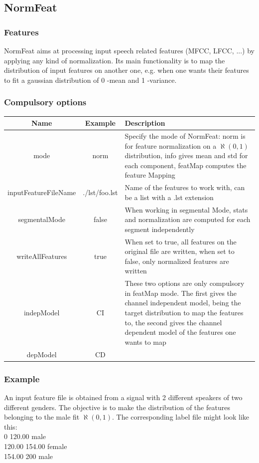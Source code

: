 \documentclass[a4paper]{article}
\begin{document}
\subsection{NormFeat}
\subsubsection{Features}
NormFeat aims at processing input speech related features (MFCC,
LFCC, ...) by applying any kind of normalization. Its main
functionality is to map the distribution of input features on
another one, e.g. when one wants their features to fit a gaussian
distribution of 0 -mean and 1 -variance.

\subsubsection{Compulsory options}

\begin{tabular}{|c|c||p{8cm}|}
\hline Name & Example & Description\\
\hline
\hline mode & norm & Specify the mode of NormFeat: norm is for feature normalization on a $\aleph(0,1)$ distribution, info gives mean and std for each component, featMap computes the feature Mapping\\
\hline inputFeatureFileName & ./lst/foo.lst & Name of the features to work with, can be a list with a .lst extension\\
\hline segmentalMode & false & When working in segmental Mode, stats and normalization are computed for each segment independently\\
\hline writeAllFeatures & true & When set to true, all features on the original file are written, when set to false, only normalized features are written\\
\hline indepModel & CI & These two options are only compulsory in featMap mode. The first gives the channel independent model, being the target distribution to map the features to, the second gives the channel dependent model of the features one wants to map\\
\cline{1-2} depModel & CD & \\
\hline
\end{tabular}

\subsubsection{Example}
An input feature file is obtained from a signal with 2 different
speakers of two different genders. The objective is to make the
distribution of the features belonging to the male fit
$\aleph(0,1)$.
The corresponding label file might look like this:\\
0 120.00 male\\
120.00 154.00 female\\
154.00 200 male\\
\end{document}
